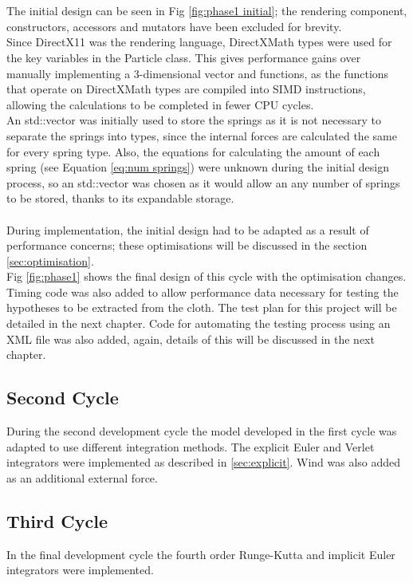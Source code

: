 \\\\The initial design can be seen in Fig \ref{fig:phase1 initial}; the rendering component, constructors, accessors and mutators have been excluded for brevity. 
\\Since DirectX11 was the rendering language, DirectXMath types were used for the key variables in the Particle class. This gives performance gains over manually implementing a 3-dimensional vector and functions, as the functions that operate on DirectXMath types are compiled into SIMD instructions, allowing the calculations to be completed in fewer CPU cycles.
\\An std::vector was initially used to store the springs as it is not necessary to separate the springs into types, since the internal forces are calculated the same for every spring type. Also, the equations for calculating the amount of each spring (see Equation \ref{eq:num springs}) were unknown during the initial design process, so an std::vector was chosen as it would allow an any number of springs to be stored, thanks to its expandable storage.
\\\\During implementation, the initial design had to be adapted as a result of performance concerns; these optimisations will be discussed in the section \ref{sec:optimisation}.
\\Fig \ref{fig:phase1} shows the final design of this cycle with the optimisation changes. Timing code was also added to allow performance data necessary for testing the hypotheses to be extracted from the cloth. The test plan for this project will be detailed in the next chapter. Code for automating the testing process using an XML file was also added, again, details of this will be discussed in the next chapter.

\subsection{Second Cycle}
During the second development cycle the model developed in the first cycle was adapted to use different integration methods. The explicit Euler and Verlet integrators were implemented as described in \ref{sec:explicit}. Wind was also added as an additional external force.

\subsection{Third Cycle}
In the final development cycle the fourth order Runge-Kutta and implicit Euler integrators were implemented.

